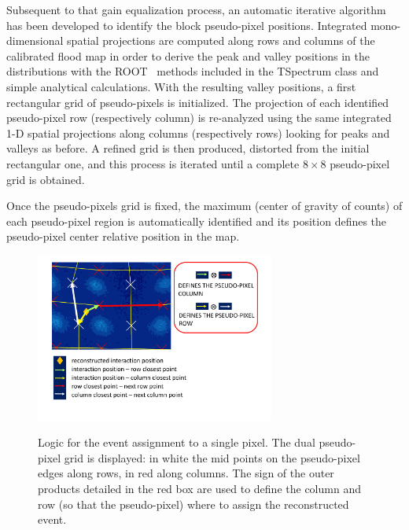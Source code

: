 Subsequent to that gain equalization process, an automatic iterative algorithm has been developed to identify the block pseudo-pixel positions. Integrated mono-dimensional spatial projections are computed along rows and columns of the calibrated flood map in order to derive the peak and valley positions in the distributions with the ROOT~\parencite{Brun1997} methods included in the TSpectrum class and simple analytical calculations. With the resulting valley positions, a first rectangular grid of pseudo-pixels is initialized. The projection of each identified pseudo-pixel row (respectively column) is re-analyzed using the same integrated 1-D spatial projections along columns (respectively rows) looking for peaks and valleys as before. 
A refined grid is then produced, distorted from the initial rectangular one, and this process is iterated until a complete $8\times8$ pseudo-pixel grid is obtained. 

Once the pseudo-pixels grid is fixed, the maximum (center of gravity of counts) of each pseudo-pixel region is automatically identified and its position defines the pseudo-pixel center relative position in the map. 

\begin{figure} [!h]
\centering
{\includegraphics[width=0.7\textwidth]{03_GraphicFiles/chapter3_CLaRySproto/Absorber/images_charResults_Co60/vector_def.pdf}}
\caption{Logic for the event assignment to a single pixel. The dual pseudo-pixel grid is displayed: in white the mid points on the pseudo-pixel edges along rows, in red along columns. The sign of the outer products detailed in the red box are used to define the column and row (so that the pseudo-pixel) where to assign the reconstructed event.}
\label{chap3::fig::vectors}
\end{figure}

